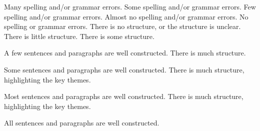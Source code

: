 \documentclass{../../fal_assignment}
\begin{document}
\begin{markingrubric}
        \grade 		Many spelling and/or grammar errors.
        \grade 		Some spelling and/or grammar errors.  
        \grade 		Few spelling and/or grammar errors.
        \grade 		Almost no spelling and/or grammar errors.
        \grade 		No spelling or grammar errors.
%
        \grade\fail 	There is no structure, or the structure is unclear.
        \grade 		There is little structure.
        \grade 		There is some structure.
        \par 		A few sentences and paragraphs are well constructed.
        \grade 		There is much structure.
        \par 		Some sentences and paragraphs are well constructed.
        \grade 		There is much structure, highlighting the key themes.
        \par 		Most sentences and paragraphs are well constructed.
        \grade 		There is much structure, highlighting the key themes.
        \par 		All sentences and paragraphs are well constructed.
\end{markingrubric}
\end{document}
